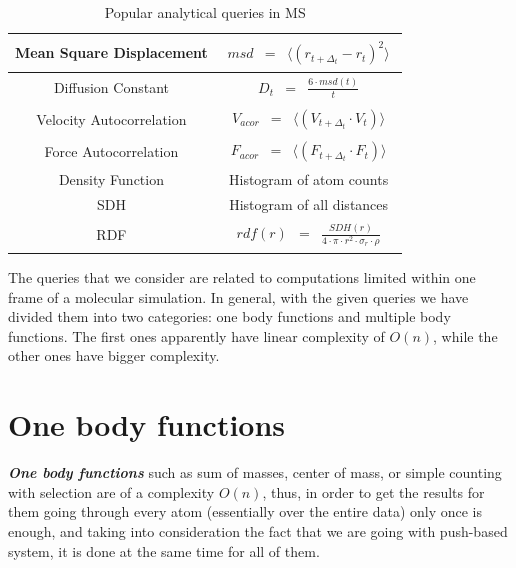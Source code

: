 \documentclass[11pt,a4paper]{report}
\begin{document}
\begin{table}[h]
{\begin{minipage}{\columnwidth}
\begin{tabular}{|c| c|}
\hline
Mean Square Displacement& $\begin{array} {lcl} msd & = & \langle (r_{t+\Delta_t}-r_t)^2 \rangle \end{array}$ \\[0.5ex]
\hline
Diffusion Constant & $\begin{array} {lcl} D_t & = & \frac{6 \cdot msd(t)}{t} \end{array}$ \\[0.5ex]
\hline Velocity Autocorrelation & $\begin{array} {lcl} V_{acor} & =&
\langle (V_{t+\Delta_t}\cdot V_t) \rangle \end{array}$ \\[0.5ex]
\hline
Force Autocorrelation & $\begin{array} {lcl} F_{acor} & = & \langle (F_{t+\Delta_t} \cdot F_t) \rangle \end{array}$ \\[0.5ex]
\hline
Density Function & Histogram of atom counts \\[0.5ex]
\hline
SDH & Histogram of all distances \\[0.5ex]
\hline
RDF & $\begin{array} {lcl} rdf(r) & = & \frac{SDH(r)}{4 \cdot \pi \cdot r^2 \cdot \sigma_r \cdot \rho} \end{array}$ \\[0.5ex]
\hline
\end{tabular}
\caption[Popular analytical queries in MS]{Popular analytical queries in MS }
\label{tb:queries}

\end{minipage}

}
\end{table}

The queries that we consider are related to computations limited within one frame of a molecular simulation. In general, with the given queries we have divided them into two categories: one body functions and multiple body functions. The first ones apparently have linear complexity of $O(n)$, while the other ones have bigger complexity. 

\section{One body functions}
\emph{\textbf{One body functions}} such as sum of masses, center of mass, or simple counting with selection  are of a complexity $O(n)$, thus, in order to get the results for them going through every atom (essentially over the entire data) only once is enough, and taking into consideration the fact that we are going with push-based system, it is done at the same time for all of them.
\end{document}

